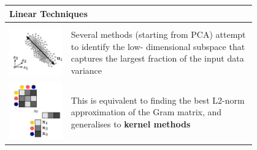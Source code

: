 \documentclass[11pt]{article}
\theoremstyle{definition}
\begin{document}
\newpage
\noindent
\begin{tabularx}{\linewidth}{m{0.2\linewidth} m{0.6\linewidth}}
	\multicolumn{2}{l}{\textbf{Linear Techniques}}\\
	\hline
	&\\[-0.5em]
	\includegraphics[width=\linewidth]{img/input_data_variance} & Several methods (starting from PCA) attempt to identify the low- dimensional subspace that captures the largest fraction of the input data variance\\
	\includegraphics[width=\linewidth]{img/kernel_method} & This is equivalent to finding the best L2-norm approximation of the Gram matrix, and generalises to \textbf{kernel methods}\\

\end{tabularx}
\end{document}
